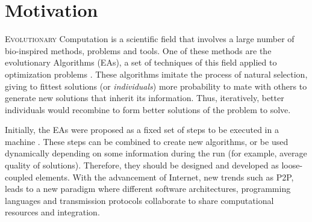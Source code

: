 \section{Motivation}
\label{sec:intro:eas}


\lettrine{E}{volutionary} Computation is a scientific field that
involves a large number of bio-inspired methods, problems and
tools. One of these methods are the evolutionary Algorithms (EAs), a set
of techniques of this field applied to optimization problems
\cite{eiben2010whatis}. These algorithms imitate the process of
natural selection, giving to fittest solutions (or {\em individuals})
more probability to mate with others to generate new solutions that
inherit its information. Thus, iteratively, better individuals would
recombine to form better solutions of the problem to solve. %

Initially, the EAs were proposed as a fixed set of steps to be
executed in a machine \cite{eiben2010whatis}. %
These steps can be combined to create new algorithms, or be used %
dynamically  depending on some information during the run (for
example, average quality of solutions). Therefore, they should be
designed and developed as loose-coupled elements. With the advancement
of Internet, new trends such as P2P, leads to a new paradigm where
different software architectures, programming languages and
transmission protocols collaborate to share computational resources
and integration.  

